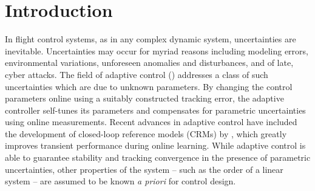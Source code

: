 \documentclass[english]{ifacconf}
\begin{document}
\section{Introduction}
In flight control systems, as in any complex dynamic system, uncertainties are inevitable. Uncertainties may occur for myriad reasons including modeling errors, environmental variations, unforeseen anomalies and disturbances, and of late, cyber attacks. The field of adaptive control (\cite{narendra2012stable, lavretsky2013robust}) addresses a class of such uncertainties which are due to unknown parameters. By changing the control parameters online using a suitably constructed tracking error, the adaptive controller self-tunes its parameters and compensates for parametric uncertainties using online measurements. Recent advances in adaptive control have included the development of closed-loop reference models (CRMs) by \cite{gibson2013adaptive}, which greatly improves transient performance during online learning. While adaptive control is able to guarantee stability and tracking convergence in the presence of parametric uncertainties, other properties of the system -- such as the order of a linear system -- are assumed to be known \textit{a priori} for control design. 
\end{document}
